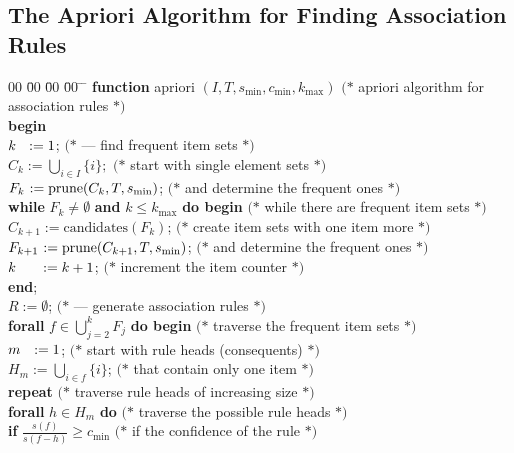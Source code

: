 \documentclass{article}
\def\lftbox#1#2{\hbox to0pt{#2\hss}\phantom{#1}}
\begin{document}
\subsection*{The Apriori Algorithm for Finding Association Rules}

\vskip5mm
\begin{tabbing}
00 \= 00 \= 00 \= 00 \= \hskip60mm \= \kill
{\bf function} apriori $(I, T, s_{\min}, c_{\min}, k_{\max})$
   \>\>\>\>\> $(*$ apriori algorithm for association rules $*)$ \\
{\bf begin} \\
\> $\lftbox{C_k}{$k$} := 1$;
   \>\>\>\> $(*$ --- find frequent item sets $*)$ \\
\> $C_k := \bigcup_{i \in I} \{i\};$
   \>\>\>\> $(*$ start with single element sets $*)$ \\
\> $\lftbox{C_k}{$F_k$} := \mbox{prune}(C_k, T, s_{\min})$;
   \>\>\>\> $(*$ and determine the frequent ones $*)$ \\
\> {\bf while} $F_k \neq \emptyset$
   {\bf and}   $k \le k_{\max}$ {\bf do begin}
   \>\>\>\>   $(*$ while there are frequent item sets $*)$ \\
\> \> $C_{k+1} := \mbox{candidates}(F_k)$;
   \>\>\>     $(*$ create item sets with one item more $*)$ \\
\> \> $\lftbox{C_{k+1}}{$F_{k+1}$}
               := \mbox{prune}(C_{k+1}, T, s_{\min})$;
   \>\>\>     $(*$ and determine the frequent ones $*)$ \\
\> \> $\lftbox{C_{k+1}}{$k$} := k+1$;
   \>\>\>     $(*$ increment the item counter $*)$ \\
\> {\bf end}; \\
\> $R := \emptyset$;
   \>\>\>\>   $(*$ --- generate association rules $*)$ \\
\> {\bf forall} $f \in \bigcup_{j=2}^k F_j$ {\bf do begin}
   \>\>\>\>   $(*$ traverse the frequent item sets $*)$ \\
\> \> $\lftbox{H_m}{$m$} := 1$;
   \>\>\>     $(*$ start with rule heads (consequents) $*)$ \\
\> \> $H_m := \bigcup_{i \in f} \{i\}$;
   \>\>\>     $(*$ that contain only one item $*)$ \\
\> \> {\bf repeat}
   \>\>\>     $(*$ traverse rule heads of increasing size $*)$ \\
\> \> \> {\bf forall} $h \in H_m$ {\bf do}
   \>\>       $(*$ traverse the possible rule heads $*)$ \\
\> \> \> \> {\bf if} $\frac{s(f)}{s(f-h)} \ge c_{\min}$
   \>         $(*$ if the confidence of the rule $*)$ \\

\end{tabbing}
\end{document}
